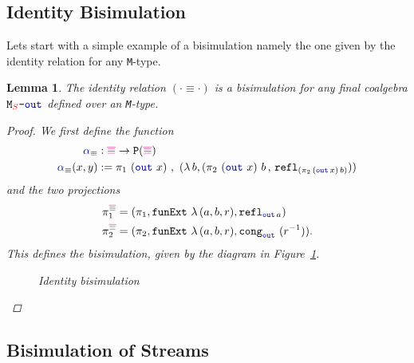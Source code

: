 \documentclass[twoside,11pt,openright]{report}
\theoremstyle{plain} %
\newtheorem{lem}[thm]{Lemma}
\theoremstyle{definition}
\theoremstyle{remark}
\newcommand*{\figref}[1]{Figure~\ref{fig:#1}}
\newcommand*{\type}[1]{\textcolor{magenta!90!black}{#1}}
\newcommand*{\container}[1]{\textcolor{red}{#1}}
\newcommand*{\coalg}[2]{#1\texttt{-}#2}
\newcommand*{\function}[1]{\textcolor{blue!60!black}{\ensuremath{\mathtt{#1}}}}
\newcommand*{\typeformer}[1]{\ensuremath{\mathtt{#1}}}
\newcommand*{\functor}[1]{\ensuremath{\mathbf{\mathtt{#1}}}}
\newcommand*{\sym}[1]{\ensuremath{#1^{-1}}}
\begin{document}
\subsection{Identity Bisimulation}
Lets start with a simple example of a bisimulation namely the one given by the identity relation for any \texttt{M}-type.
\begin{lem}
  The identity relation \((\cdot \equiv \cdot)\) is a bisimulation for any final coalgebra \(\coalg{\typeformer{M}_{\container{S}}}{\function{out}}\) defined over an \texttt{M}-type.
  
  \begin{proof}
  We first define the function
  \begin{equation}
    \begin{aligned}
      \function{\alpha}_{\equiv} &: \type{\overline{\equiv}} \rightarrow \functor{P}(\type{\overline{\equiv}}) \\
      \function{\alpha}_{\equiv} (x , y) &:= \pi_1~(\function{out}~x)~,~(\lambda\,b, (\pi_2~(\function{out}~x)~b \,,\, \texttt{refl}_{(\pi_2\,(\function{out}\,x)\,b)}))
    \end{aligned}
  \end{equation}
  and the two projections
  \begin{align}
    \pi_1^{\type{\overline{\equiv}}} &= (\pi_1 , \texttt{funExt}~\lambda\,(a,b,r), \texttt{refl}_{\function{out}\,a}) \\
    \pi_2^{\type{\overline{\equiv}}} &= (\pi_2 , \texttt{funExt}~\lambda\,(a,b,r), \texttt{cong}_{\function{out}}~(\sym{r})).
  \end{align}
  This defines the bisimulation, given by the diagram in \figref{id-bisim}.
  \begin{figure}[h]
    \centering
    \caption{Identity bisimulation}
    \label{fig:id-bisim}
  \end{figure}
\end{proof}
\end{lem}
\subsection{Bisimulation of Streams}
\end{document}
